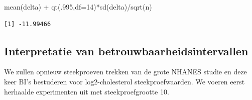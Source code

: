 \documentclass[
  dutch,
  letterpaper,
  12pt]{book}
\newenvironment{Shaded}{\begin{snugshade}}{\end{snugshade}}
\newcommand{\AttributeTok}[1]{\textcolor[rgb]{0.40,0.45,0.13}{#1}}
\newcommand{\DecValTok}[1]{\textcolor[rgb]{0.68,0.00,0.00}{#1}}
\newcommand{\FunctionTok}[1]{\textcolor[rgb]{0.28,0.35,0.67}{#1}}
\newcommand{\NormalTok}[1]{\textcolor[rgb]{0.00,0.23,0.31}{#1}}
\newcommand{\SpecialCharTok}[1]{\textcolor[rgb]{0.37,0.37,0.37}{#1}}
\theoremstyle{definition}
\theoremstyle{definition}
\theoremstyle{definition}
\theoremstyle{remark}
\begin{document}
\begin{Shaded}
\begin{Highlighting}[]
\FunctionTok{mean}\NormalTok{(delta) }\SpecialCharTok{+} \FunctionTok{qt}\NormalTok{(.}\DecValTok{995}\NormalTok{,}\AttributeTok{df=}\DecValTok{14}\NormalTok{)}\SpecialCharTok{*}\FunctionTok{sd}\NormalTok{(delta)}\SpecialCharTok{/}\FunctionTok{sqrt}\NormalTok{(n)}
\end{Highlighting}
\end{Shaded}

\begin{verbatim}
[1] -11.99466
\end{verbatim}

\subsection{Interpretatie van
betrouwbaarheidsintervallen}\label{sec-interpretBI}

We zullen opnieuw steekproeven trekken van de grote NHANES studie en
deze keer BI's bestuderen voor log2-cholesterol steekproefwaarden. We
voeren eerst herhaalde experimenten uit met steekproefgrootte 10.
\end{document}

